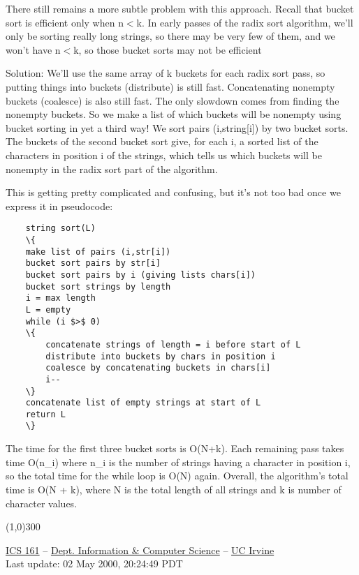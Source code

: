 \documentclass[a4paper,11pt]{article}
\begin{document}
There still remains a more subtle problem with this approach.  Recall
that bucket sort is efficient only when n$<$k. In early passes of the
radix sort algorithm, we'll only be sorting really long strings, so
there may be very few of them, and we won't have n$<$k, so those
bucket sorts may not be efficient

Solution: We'll use the same array of k buckets for each radix sort
pass, so putting things into buckets (distribute) is still fast.
Concatenating nonempty buckets (coalesce) is also still fast.  The
only slowdown comes from finding the nonempty buckets. So we make a
list of which buckets will be nonempty using bucket sorting in yet a
third way! We sort pairs (i,string[i]) by two bucket sorts. The
buckets of the second bucket sort give, for each i, a sorted list of
the characters in position i of the strings, which tells us which
buckets will be nonempty in the radix sort part of the algorithm.

This is getting pretty complicated and confusing, but it's not too bad
once we express it in pseudocode:
\begin{verbatim}
    string sort(L)
    \{
    make list of pairs (i,str[i])
    bucket sort pairs by str[i]
    bucket sort pairs by i (giving lists chars[i])
    bucket sort strings by length
    i = max length
    L = empty
    while (i $>$ 0)
    \{
        concatenate strings of length = i before start of L
        distribute into buckets by chars in position i
        coalesce by concatenating buckets in chars[i]
        i--
    \}
    concatenate list of empty strings at start of L
    return L
    \}
\end{verbatim}

The time for the first three bucket sorts is O(N+k). Each remaining
pass takes time O(n\_i) where n\_i is the number of strings having a
character in position i, so the total time for the while loop is O(N)
again. Overall, the algorithm's total time is O(N + k), where N is the
total length of all strings and k is number of character values.


\line(1,0){300}


\href{http://www.ics.uci.edu/%7Eeppstein/161/}{ICS 161} -- \href{http://www.ics.uci.edu/}{Dept. 
Information \& Computer Science} -- \href{http://www.uci.edu/}{UC Irvine}
\\\scriptsize Last update: 
02 May 2000, 20:24:49 PDT \normalsize
\end{document}
